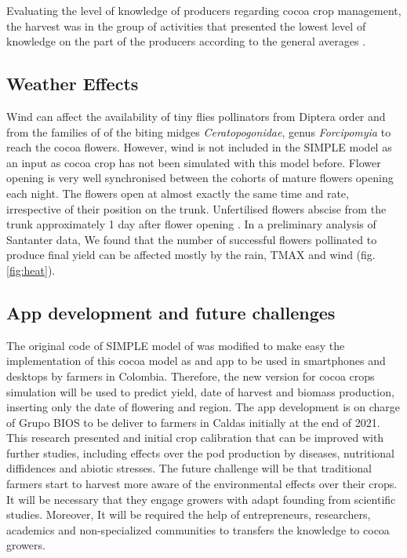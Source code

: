\documentclass[gene,journal,article,submit,moreauthors,pdftex]{Definitions/mdpi}
\begin{document}
Evaluating the level of knowledge of producers regarding cocoa crop management, the harvest was in the group of activities that presented the lowest level of knowledge on the part of the producers according to the general averages \citep{Gutierrez2020}. 

\subsection{Weather Effects}
Wind can affect the availability of tiny flies pollinators from Diptera order and from the families of of the biting midges \textit{Ceratopogonidae},  genus  \textit{Forcipomyia} \citep{Saunders1959, kaufmann1975, sotomayor2020} to reach the cocoa flowers. However, wind is not included in the SIMPLE model as an input as cocoa crop has not been simulated with this model before. Flower opening is very well synchronised between the cohorts of mature flowers opening each night. The flowers open at almost exactly the same time and rate, irrespective of their position on the trunk. Unfertilised flowers abscise from the trunk approximately 1 day after flower opening  \citep{Niemenak2010}.  In a preliminary analysis of Santanter data, We found that the number of successful flowers pollinated to produce final yield can be affected mostly by the rain, TMAX and wind (fig.\ref{fig:heat}).

\subsection{App development and future challenges }
The original code of SIMPLE model of \citep{Zao2019simple} was modified to make easy the implementation of this cocoa model as and app to be used in smartphones and desktops by farmers in Colombia. Therefore, the new version for cocoa crops simulation will be used to predict yield, date of harvest and biomass production, inserting only the date of flowering and region. The app development is on charge of Grupo BIOS to be deliver to farmers in Caldas initially at the end of 2021. 
This research presented and initial crop calibration that can be improved with further studies, including effects over the pod production by diseases, nutritional diffidences and abiotic stresses. The future challenge will be that traditional farmers start to harvest more aware of the environmental effects over their crops. It will be necessary that they engage growers with adapt founding from scientific studies. Moreover, It will be required the help of entrepreneurs, researchers, academics and non-specialized communities to transfers the knowledge to cocoa growers.
\end{document}
